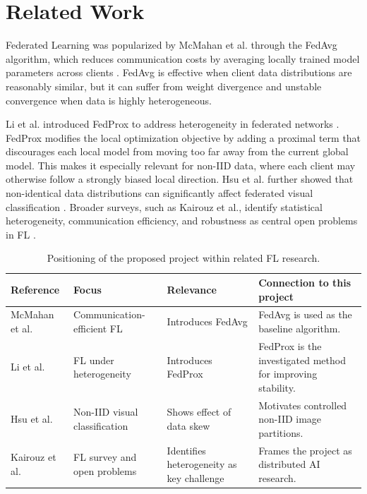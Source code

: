 \documentclass[11pt,a4paper]{article}
\begin{document}
\section{Related Work}

Federated Learning was popularized by McMahan et al. through the FedAvg algorithm, which reduces communication costs by averaging locally trained model parameters across clients \cite{mcmahan2017communication}. FedAvg is effective when client data distributions are reasonably similar, but it can suffer from weight divergence and unstable convergence when data is highly heterogeneous.

Li et al. introduced FedProx to address heterogeneity in federated networks \cite{li2020federated}. FedProx modifies the local optimization objective by adding a proximal term that discourages each local model from moving too far away from the current global model. This makes it especially relevant for non-IID data, where each client may otherwise follow a strongly biased local direction. Hsu et al. further showed that non-identical data distributions can significantly affect federated visual classification \cite{hsu2019measuring}. Broader surveys, such as Kairouz et al., identify statistical heterogeneity, communication efficiency, and robustness as central open problems in FL \cite{kairouz2021advances}.

\begin{table}[H]
\centering
\caption{Positioning of the proposed project within related FL research.}
\begin{tabularx}{\textwidth}{L{2.4cm} L{3.0cm} L{3.0cm} Y}
\toprule
\textbf{Reference} & \textbf{Focus} & \textbf{Relevance} & \textbf{Connection to this project} \\
\midrule
McMahan et al. \cite{mcmahan2017communication} & Communication-efficient FL & Introduces FedAvg & FedAvg is used as the baseline algorithm. \\
Li et al. \cite{li2020federated} & FL under heterogeneity & Introduces FedProx & FedProx is the investigated method for improving stability. \\
Hsu et al. \cite{hsu2019measuring} & Non-IID visual classification & Shows effect of data skew & Motivates controlled non-IID image partitions. \\
Kairouz et al. \cite{kairouz2021advances} & FL survey and open problems & Identifies heterogeneity as key challenge & Frames the project as distributed AI research. \\
\bottomrule
\end{tabularx}
\end{table}
\end{document}
